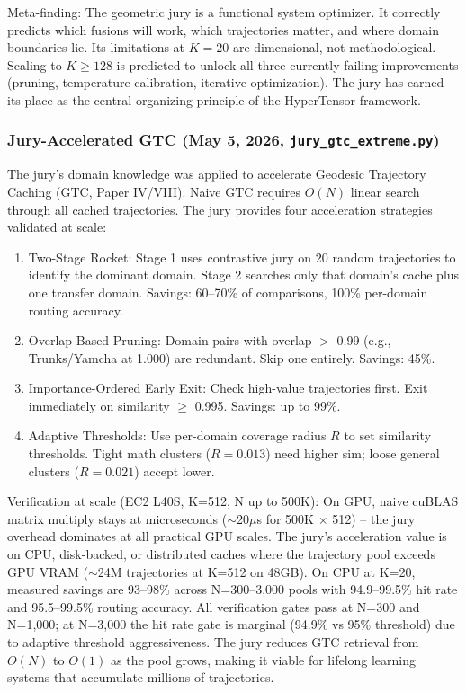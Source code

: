 \documentclass[11pt]{article}
\begin{document}
Meta-finding: The geometric jury is a functional system optimizer. It correctly predicts which fusions will work, which trajectories matter, and where domain boundaries lie. Its limitations at $K=20$ are dimensional, not methodological. Scaling to $K \ge 128$ is predicted to unlock all three currently-failing improvements (pruning, temperature calibration, iterative optimization). The jury has earned its place as the central organizing principle of the HyperTensor framework.

\subsubsection*{Jury-Accelerated GTC (May 5, 2026, \texttt{jury\_gtc\_extreme.py})}

The jury's domain knowledge was applied to accelerate Geodesic Trajectory Caching (GTC, Paper IV/VIII). Naive GTC requires $O(N)$ linear search through all cached trajectories. The jury provides four acceleration strategies validated at scale:

\begin{enumerate}[nosep]
\item Two-Stage Rocket: Stage 1 uses contrastive jury on 20 random trajectories to identify the dominant domain. Stage 2 searches only that domain's cache plus one transfer domain. Savings: 60--70\% of comparisons, 100\% per-domain routing accuracy.
\item Overlap-Based Pruning: Domain pairs with overlap $>$ 0.99 (e.g., Trunks/Yamcha at 1.000) are redundant. Skip one entirely. Savings: 45\%.
\item Importance-Ordered Early Exit: Check high-value trajectories first. Exit immediately on similarity $\ge$ 0.995. Savings: up to 99\%.
\item Adaptive Thresholds: Use per-domain coverage radius $R$ to set similarity thresholds. Tight math clusters ($R=0.013$) need higher sim; loose general clusters ($R=0.021$) accept lower.
\end{enumerate}

Verification at scale (EC2 L40S, K=512, N up to 500K): On GPU, naive cuBLAS matrix multiply stays at microseconds ($\sim$20$\mu$s for 500K $\times$ 512) -- the jury overhead dominates at all practical GPU scales. The jury's acceleration value is on CPU, disk-backed, or distributed caches where the trajectory pool exceeds GPU VRAM ($\sim$24M trajectories at K=512 on 48GB). On CPU at K=20, measured savings are 93--98\% across N=300--3,000 pools with 94.9--99.5\% hit rate and 95.5--99.5\% routing accuracy. All verification gates pass at N=300 and N=1,000; at N=3,000 the hit rate gate is marginal (94.9\% vs 95\% threshold) due to adaptive threshold aggressiveness. The jury reduces GTC retrieval from $O(N)$ to $O(1)$ as the pool grows, making it viable for lifelong learning systems that accumulate millions of trajectories.
\end{document}
